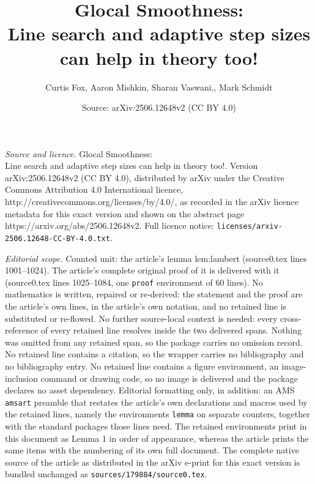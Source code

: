\documentclass[10pt,a4paper]{amsart}
\title{Glocal Smoothness:\\ Line search and adaptive step sizes can help in theory too!}
\author{Curtis Fox, Aaron Mishkin, Sharan Vaswani,, Mark Schmidt}
\date{Source: arXiv:2506.12648v2 (CC BY 4.0)}
\begin{document}
\maketitle

\noindent\emph{Source and licence.} Glocal Smoothness:\\ Line search and adaptive step sizes can help in theory too!. Version arXiv:2506.12648v2 (CC BY 4.0), distributed by arXiv under the Creative Commons Attribution 4.0 International licence, http://creativecommons.org/licenses/by/4.0/, as recorded in the arXiv licence metadata for this exact version and shown on the abstract page https://arxiv.org/abs/2506.12648v2. Full licence notice: \texttt{licenses/arxiv-2506.12648-CC-BY-4.0.txt}.\par\smallskip

\noindent\textit{Editorial scope.} Counted unit: the article's lemma lem:lambert (source0.tex lines 1001--1024). The article's complete original proof of it is delivered with it (source0.tex lines 1025--1084, one \texttt{proof} environment of 60 lines). No mathematics is written, repaired or re-derived: the statement and the proof are the article's own lines, in the article's own notation, and no retained line is substituted or re-flowed.  No further source-local context is needed: every cross-reference of every retained line resolves inside the two delivered spans.  Nothing was omitted from any retained span, so the package carries no omission record.  No retained line contains a citation, so the wrapper carries no bibliography and no bibliography entry.  No retained line contains a figure environment, an image-inclusion command or drawing code, so no image is delivered and the package declares no asset dependency.  Editorial formatting only, in addition: an AMS \texttt{amsart} preamble that restates the article's own declarations and macros used by the retained lines, namely the environments \texttt{lemma} on separate counters, together with the standard packages those lines need.  The retained environments print in this document as Lemma 1 in order of appearance, whereas the article prints the same items with the numbering of its own full document.  The complete native source of the article as distributed in the arXiv e-print for this exact version is bundled unchanged as \texttt{sources/179884/source0.tex}.
\end{document}

